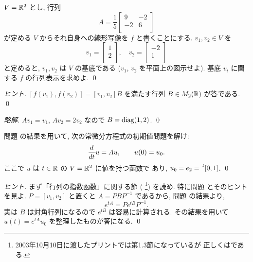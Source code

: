 \documentclass[12pt,twoside]{jarticle}
\newcommand\commentout[1]{#1}
\newcommand\commentout[1]{}
\begin{document}
\begin{question}
  \label{q:9,-2,-2,6}
  $V={\mathbb R}^2$ とし, 行列
  \begin{equation*}
    A = \frac{1}{5}
    \begin{bmatrix}
      9 & -2 \\
      -2 & 6 \\
    \end{bmatrix}
  \end{equation*}
  が定める $V$ からそれ自身への線形写像を $f$ と書くことにする.
  $v_1,v_2\in V$ を
  \begin{equation*}
    v_1 = %
    \begin{bmatrix} 1 \\ 2 \\ \end{bmatrix},
    \quad
    v_2 = %
    \begin{bmatrix} -2 \\ 1 \\ \end{bmatrix}
  \end{equation*}
  と定めると, $v_1,v_2$ は $V$ の基底である
  ($v_1$, $v_2$ を平面上の図示せよ).
  基底 $v_i$ に関する $f$ の行列表示を求めよ.
  \qed
\end{question}

\begin{proof}[ヒント]
  $[f(v_1),f(v_2)]=[v_1,v_2]B$ を満たす行列 $B\in M_2({\mathbb R})$ が答である.
  \qed
\end{proof}

\commentout{
\begin{proof}[略解]
  $Av_1=v_1$, $Av_2=2v_2$ なので $B=\mathop{\mathrm{diag}}\nolimits(1,2)$. \qed
\end{proof}
}


\begin{question}
  \label{q:9,-2,-2,6-ODE}
  問題  の結果を用いて,
  次の常微分方程式の初期値問題を解け:
  \begin{equation*}
    \frac{d}{d t}u = Au, \qquad u(0) = u_0.
  \end{equation*}
  ここで $u$ は $t\in{\mathbb R}$ の $V={\mathbb R}^2$ に値を持つ函数で
  あり, $u_0 = e_2 = \tp{[0,1]}$.
  \qed
\end{question}

\begin{proof}[ヒント]
  まず「行列の指数函数」に関する節 (%
  \footnote{2003年10月10日に渡したプリントでは第1.3節になっているが
    正しくはである.}) を読め.
  特に問題  とそのヒントを見よ.
  $P = [v_1,v_2]$ と置くと $A=PBP^{-1}$ であるから,
  問題  の結果より, 
  \begin{equation*}
    e^{tA} = Pe^{tB}P^{-1}.
  \end{equation*}
  実は $B$ は対角行列になるので $e^{tB}$ は容易に計算される.
  その結果を用いて $u(t) = e^{tA}u_0$ を整理したものが答になる.
  \qed
\end{proof}
\end{document}
